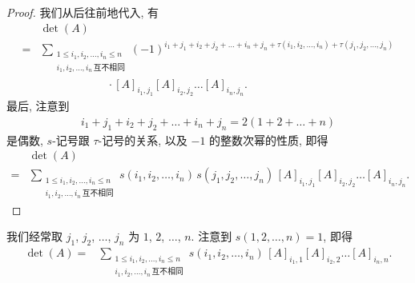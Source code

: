 \documentclass[%
    UTF8,%
    fontset=none,%
    punct=kaiming,%
    zihao=-4,%
    a4paper,%
    oneside,%
]{ctexbook}
\renewcommand*{\leq}{\leqslant}
\begin{document}
\begin{proof}
    我们从后往前地代入, 有
    \begin{align*}
             & \det {(A)}
        \\
        = {} & \sum_{\substack{
        1 \leq i_1, i_2, \dots, i_n \leq n \\
                i_1, i_2, \dots, i_n\,\text{互不相同}
            }}
        {(-1)^{i_1 + j_1 + i_2 + j_2 + \dots + i_n + j_n
                    + \tau(i_1, i_2, \dots, i_n)
                    + \tau(j_1, j_2, \dots, j_n)}}
        \\
             &
        \qquad \qquad \qquad
        \cdot
        [A]_{i_1,j_1} [A]_{i_2,j_2} \dots [A]_{i_n,j_n}.
    \end{align*}
    最后, 注意到
    \begin{align*}
        i_1 + j_1 + i_2 + j_2 + \dots + i_n + j_n
        = 2(1 + 2 + \dots + n)
    \end{align*}
    是偶数,
    \(s\)-记号跟 \(\tau\)-记号的关系,
    以及 \(-1\) 的整数次幂的性质,
    即得
    \begin{align*}
             & \det {(A)}
        \\
        = {} &
        \sum_{\substack{
        1 \leq i_1, i_2, \dots, i_n \leq n \\
                i_1, i_2, \dots, i_n\,\text{互不相同}
            }}
        {s(i_1, i_2, \dots, i_n)\,
            s(j_1, j_2, \dots, j_n)\,
            [A]_{i_1,j_1} [A]_{i_2,j_2} \dots [A]_{i_n,j_n}}.
    \end{align*}
\end{proof}

我们经常取 \(j_1\), \(j_2\), \(\dots\), \(j_n\)
为 \(1\), \(2\), \(\dots\), \(n\).
注意到 \(s(1, 2, \dots, n) = 1\),
即得
\begin{align*}
    \det {(A)}
    = {} &
    \sum_{\substack{
    1 \leq i_1, i_2, \dots, i_n \leq n \\
            i_1, i_2, \dots, i_n\,\text{互不相同}
        }}
    {s(i_1, i_2, \dots, i_n)\,
        [A]_{i_1,1} [A]_{i_2,2} \dots [A]_{i_n,n}}.
\end{align*}
\end{document}
